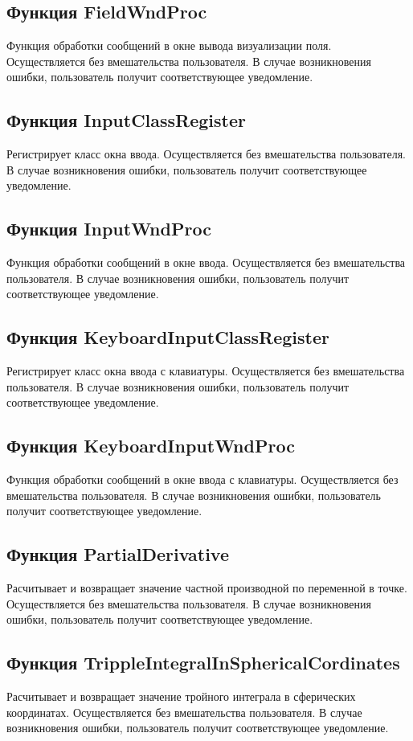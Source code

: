 \documentclass[14pt,a4paper,final]{extreport}
\begin{document}
\subsection{Функция FieldWndProc}
Функция обработки сообщений в окне вывода визуализации поля. Осуществляется без вмешательства пользователя. 
В случае возникновения ошибки, пользователь получит соответствующее уведомление.

\subsection{Функция InputClassRegister}
Регистрирует класс окна ввода. Осуществляется без вмешательства пользователя. 
В случае возникновения ошибки, пользователь получит соответствующее уведомление.

\subsection{Функция InputWndProc}
Функция обработки сообщений в окне ввода. Осуществляется без вмешательства пользователя. 
В случае возникновения ошибки, пользователь получит соответствующее уведомление.

\subsection{Функция KeyboardInputClassRegister}
Регистрирует класс окна ввода с клавиатуры. Осуществляется без вмешательства пользователя. 
В случае возникновения ошибки, пользователь получит соответствующее уведомление.

\subsection{Функция KeyboardInputWndProc}
Функция обработки сообщений в окне ввода с клавиатуры. Осуществляется без вмешательства пользователя. 
В случае возникновения ошибки, пользователь получит соответствующее уведомление.

\subsection{Функция PartialDerivative}
Расчитывает и возвращает значение частной производной по переменной в точке. Осуществляется без вмешательства пользователя. 
В случае возникновения ошибки, пользователь получит соответствующее уведомление.

\subsection{Функция TrippleIntegralInSphericalCordinates}
Расчитывает и возвращает значение тройного интеграла в сферических координатах. Осуществляется без вмешательства пользователя. 
В случае возникновения ошибки, пользователь получит соответствующее уведомление.
\end{document}
